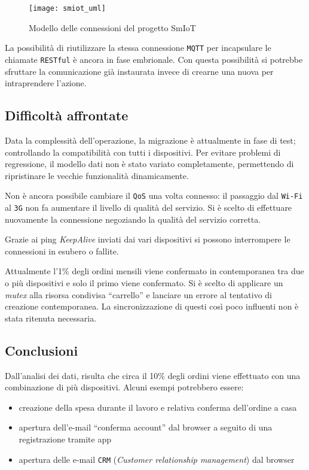 \begin{figure}[H]
  \centering
  \texttt{[image: smiot\_uml]}
  \caption{Modello delle connessioni del progetto SmIoT}
  \label{fig:smiotUml}
\end{figure}

La possibilità di riutilizzare la stessa connessione \verb+MQTT+ per incapsulare le chiamate \verb+RESTful+ è ancora in fase embrionale.
Con questa possibilità si potrebbe sfruttare la comunicazione già instaurata invece di crearne una nuova per intraprendere l'azione.

\subsection{Difficoltà affrontate}
\label{subsec:smiotDifficolta}

Data la complessità dell'operazione, la migrazione è attualmente in fase di test; controllando la compatibilità con tutti i dispositivi.
Per evitare problemi di regressione, il modello dati non è stato variato completamente, permettendo di ripristinare le vecchie funzionalità dinamicamente.

Non è ancora possibile cambiare il \verb+QoS+ una volta connesso: il passaggio dal \verb+Wi-Fi+ al \verb+3G+ non fa aumentare il livello di qualità del servizio.
Si è scelto di effettuare nuovamente la connessione negoziando la qualità del servizio corretta.

Grazie ai ping \textit{KeepAlive} inviati dai vari dispositivi si possono interrompere le connessioni in esubero o fallite.

Attualmente l'1\% degli ordini mensili viene confermato in contemporanea tra due o più dispositivi e solo il primo viene confermato.
Si è scelto di applicare un \textit{mutex} alla risorsa condivisa ``carrello'' e lanciare un errore al tentativo di creazione contemporanea.
La sincronizzazione di questi così poco influenti non è stata ritenuta necessaria.

\subsection{Conclusioni}
\label{subsec:smiotConclusioni}

Dall'analisi dei dati, risulta che circa il 10\% degli ordini viene effettuato con una combinazione di più dispositivi.
Alcuni esempi potrebbero essere:
\begin{itemize}
  \item creazione della spesa durante il lavoro e relativa conferma dell'ordine a casa
  \item apertura dell'e-mail ``conferma account'' dal browser a seguito di una registrazione tramite app
  \item apertura delle e-mail \verb+CRM+ (\textit{Customer relationship management}) dal browser
\end{itemize}


